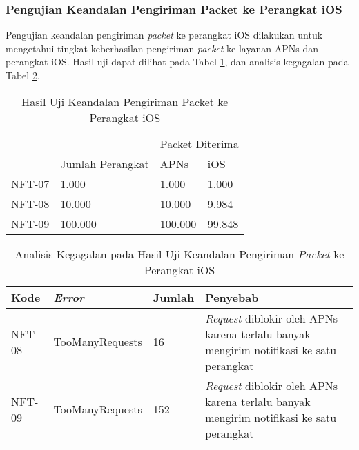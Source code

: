 \subsubsection{Pengujian Keandalan Pengiriman Packet ke Perangkat iOS}
\par Pengujian keandalan pengiriman \textit{packet} ke perangkat iOS dilakukan untuk mengetahui tingkat keberhasilan pengiriman \textit{packet} ke layanan APNs dan perangkat iOS. Hasil uji dapat dilihat pada Tabel \ref{t:keandalan_ios}, dan analisis kegagalan pada Tabel \ref{t:analisis_ios}.
\begin{longtable}{|p{1.3cm}|p{3cm}|p{1.5cm}|p{1.5cm}|}
	\caption{Hasil Uji Keandalan Pengiriman Packet ke Perangkat iOS} \label{t:keandalan_ios} \\ \hline
	\rowcolor{lightgray} &  & \multicolumn{2}{c|}{Packet Diterima} \\ \hhline{~|~|*2{-}|}
	\rowcolor{lightgray} \multirow{-2}{*}{Kode} & \multirow{-2}{*}{Jumlah Perangkat} & APNs & iOS \\ \hline
	NFT-07 & 1.000 & 1.000 & 1.000 \\ \hline
	NFT-08 & 10.000 & 10.000 & 9.984 \\ \hline
	NFT-09 & 100.000 & 100.000 & 99.848 \\ \hline
\end{longtable}
\begin{longtable}{|p{1.3cm}|p{3cm}|p{1cm}|p{3cm}|}
	\caption{Analisis Kegagalan pada Hasil Uji Keandalan Pengiriman \textit{Packet} ke Perangkat iOS} \label{t:analisis_ios} \\ \hline
	\rowcolor{lightgray} Kode & \textit{Error} & Jumlah & Penyebab \\ \hline
	NFT-08 & TooManyRequests & 16 & \textit{Request} diblokir oleh APNs karena terlalu banyak mengirim notifikasi ke satu perangkat \\ \hline
	NFT-09 & TooManyRequests & 152 & \textit{Request} diblokir oleh APNs karena terlalu banyak mengirim notifikasi ke satu perangkat \\ \hline
\end{longtable}

